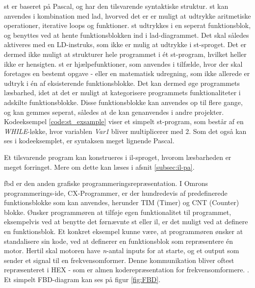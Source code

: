 \gls{st} er baseret på Pascal, og har den tilsvarende syntaktiske struktur. \gls{st} kan anvendes i kombination med \gls{lad}, hvorved det er er muligt at udtrykke aritmetiske operationer, iterative loops og funktioner. \gls{st} udtrykkes i en seperat funktionsblok, og benyttes ved at hente funktionsblokken ind i \gls{lad}-diagrammet. Det skal således aktiveres med en LD-instruks, som ikke er mulig at udtrykke i \gls{st}-sproget. Det er dermed ikke muligt at strukturer hele programmet i ét \gls{st}-program, hvilket heller ikke er hensigten. \gls{st} er hjælpefunktioner, som anvendes i tilfælde, hvor der skal foretages en bestemt opgave - eller en matematisk udregning, som ikke allerede er udtryk i én af eksisterende funktionsblokke. Det kan dermed øge programmets læsbarhed, idet at det er muligt at kategorisere programmets funktionaliteter i adskilte funktionsblokke. Disse funktionsblokke kan anvendes op til flere gange, og kan gemmes seperat, således at de kan genanvendes i andre projekter.\\

\noindent Kodeeksempel \ref{code:st_exsample} viser et simpelt \gls{st}-program, som består af en \textit{WHILE}-løkke, hvor variablen \textit{Var1} bliver multiplicerer med 2. Som det også kan ses i kodeeksemplet, er syntaksen meget lignende Pascal.


\noindent Et tilsvarende program kan konstrueres i \gls{il}-sproget, hvorom læsbarheden er meget forringet. Mere om dette kan læses i afsnit \ref{subsec:il-pa}. 

\gls{fbd} er den anden grafiske programmeringsrepræsentation. I Omrons programmerings-\gls{ide}, CX-Programmer, er der hundredevis af predefinerede funktionsblokke som kan anvendes, herunder TIM (Timer) og CNT (Counter) blokke. Ønsker programmøren at tilføje egen funktionalitet til programmet, eksempelvis ved at benytte det førnævnte \gls{st} eller \gls{il}, er det muligt ved at definere en funktionsblok. Et konkret eksempel kunne være, at programmøren ønsker at standalisere sin kode, ved at definerer en funktionsblok som repræsentere én motor. Hertil skal motoren have \textit{n}-antal inputs for at starte, og et output som sender et signal til en frekvensomformer. Denne kommunikation bliver oftest repræsenteret i HEX - som er almen koderepræsentation for frekvensomformere. . Et simpelt FBD-diagram kan ses på figur \ref{fig:FBD}.

